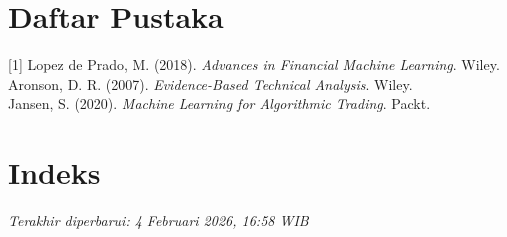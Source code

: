 \documentclass[12pt,a4paper]{book}
\begin{document}
\backmatter

\chapter*{Daftar Pustaka}
[1] Lopez de Prado, M. (2018). \textit{Advances in Financial Machine Learning}. Wiley. \\
[2] Aronson, D. R. (2007). \textit{Evidence-Based Technical Analysis}. Wiley. \\
[3] Jansen, S. (2020). \textit{Machine Learning for Algorithmic Trading}. Packt.

\chapter*{Indeks}

\vfill
\begin{center}
    \textit{Terakhir diperbarui: 4 Februari 2026, 16:58 WIB}
\end{center}
\end{document}
